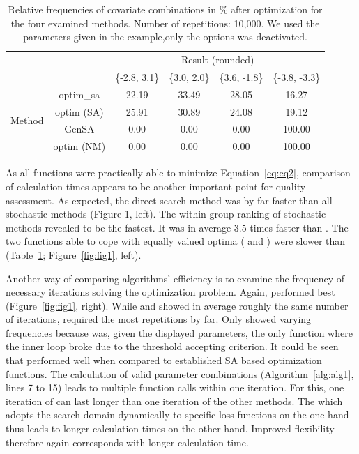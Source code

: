 \begin{table}[]
\centering
\caption{Relative frequencies of covariate combinations in \% after optimization for the four examined methods. Number of repetitions: 10,000. We used the parameters given in the example,only the  options was deactivated.}
\label{tab:tab1}
\begin{tabular}{cccccc} \cline{3-6}
& \multicolumn{1}{c}{} & \multicolumn{4}{c}{Result (rounded)}                    \\ \cline{3-6} 
&                      & \{-2.8, 3.1\} & \{3.0, 2.0\} & \{3.6, -1.8\} & \{-3.8, -3.3\} \\ \cline{2-6} 
\multirow{4}{*}{Method} & optim\_sa          & 22.19     & 33.49    & 28.05     & 16.27      \\
& optim (SA)            & 25.91     & 30.89    & 24.08     & 19.12      \\
& GenSA              & 0.00      & 0.00     & 0.00      & 100.00     \\
& optim (NM)          & 0.00      & 0.00     & 0.00      & 100.00     \\ \cline{2-6} 
\end{tabular}
\end{table}

As all functions were practically able to minimize Equation~\eqref{eq:eq2}, comparison of calculation times appears to be another important point for quality assessment. As expected, the direct search method  was by far faster than all stochastic methods (Figure 1, left). The within-group ranking of stochastic methods revealed  to be the fastest. It was in average 3.5 times faster than . The two functions able to cope with equally valued optima ( and ) were slower than  (Table~\ref{tab:tab1}; Figure~\ref{fig:fig1}, left).

Another way of comparing algorithms' efficiency is to examine the frequency of necessary iterations solving the optimization problem. Again,  performed best (Figure~\ref{fig:fig1}, right). While  and  showed in average roughly the same number of iterations,  required the most repetitions by far. Only  showed varying frequencies because  was, given the displayed parameters, the only function where the inner loop broke due to the threshold accepting criterion. It could be seen that  performed well when compared to established SA based optimization functions. The calculation of valid parameter combinations (Algorithm~\ref{alg:alg1}, lines 7 to 15) leads to multiple function calls within one iteration. For this, one iteration of  can last longer than one iteration of the other methods. The  which adopts the search domain dynamically to specific loss functions on the one hand thus leads to longer calculation times on the other hand. Improved flexibility therefore again corresponds with longer calculation time.

